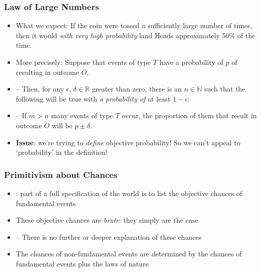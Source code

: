 \begin{frame}
\frametitle{Law of Large Numbers}

\begin{itemize}[<+->]

\item What we expect: If the coin were tossed a sufficiently large number of times, then it would \emph{with very high probability} land Heads approximately 50\% of the time.

\item More precisely: Suppose that events of type $T$ have a probability of $p$ of resulting in outcome $O$. 
\item[] -- Then, for any $\epsilon$, $\delta \in \mathbb{R}$ greater than zero, there is an $n\in\mathbb{N}$ such that the following will be true with \emph{a probability of} at least $1-\epsilon$:

\item[] -- If $m > n$ many events of type $T$ occur, the proportion of them that result in outcome $O$ will be $p \pm \delta$.

\item \textbf{Issue}: we're trying to \textit{define} objective probability! So we can't appeal to `probability' in the definition!

\end{itemize}
\end{frame}

\begin{frame}
\frametitle{Primitivism about Chances}

\begin{itemize}[<+->]

\item {}: part of a full specification of the world is to list the objective chances of fundamental events

\item These objective chances are \textit{brute}: they simply are the case

\item[] -- There is no further or deeper explanation of these chances

\item The chances of non-fundamental events are determined by the chances of fundamental events plus the laws of nature


\end{itemize}
\end{frame}

